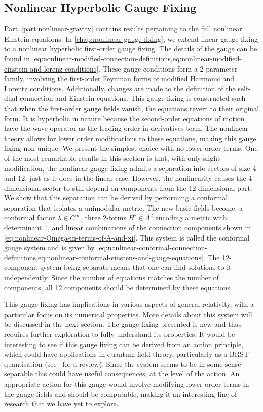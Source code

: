 \documentclass[10pt]{report}
\theoremstyle{definition}
\begin{document}
    \subsection{Nonlinear Hyperbolic Gauge Fixing}
    Part~\ref{part:nonlinear-gravity} contains results pertaining to the full nonlinear Einstein equations. In \cref{chap:nonlinear-gauge-fixing}, we extend linear gauge fixing to a nonlinear hyperbolic first-order gauge fixing. The details of the gauge can be found in \cref{eq:nonlinear-modified-connection-definitions,eq:nonlinear-modified-einstein-and-lorenz-conditions}. These gauge conditions form a 2-parameter family, involving the first-order Feynman forms of modified Harmonic and Lorentz conditions. Additionally, changes are made to the definition of the self-dual connection and Einstein equations. This gauge fixing is constructed such that when the first-order gauge fields vanish, the equations revert to their original form. It is hyperbolic in nature because the second-order equations of motion have the wave operator as the leading order in derivatives term. The nonlinear theory allows for lower order modifications to these equations, making this gauge fixing non-unique. We present the simplest choice with no lower order terms. One of the most remarkable results in this section is that, with only slight modification, the nonlinear gauge fixing admits a separation into sectors of size 4 and 12, just as it does in the linear case. However, the nonlinearity causes the 4-dimensional sector to still depend on components from the 12-dimensional part. We show that this separation can be derived by performing a conformal separation that isolates a unimodular metric. The new basic fields become: a conformal factor $\lambda \in C^\infty$, three 2-forms $H^i \in \Lambda^2$ encoding a metric with determinant 1, and linear combinations of the connection components shown in \cref{eq:nonlinear-Omega-in-terms-of-A-and-xi}. This system is called the conformal gauge system and is given by \cref{eq:nonlinear-conformal-connection-definitions,eq:nonlinear-conformal-einstens-and-gauge-equations}. The 12-component system being separate means that one can find solutions to it independently. Since the number of equations matches the number of components, all 12 components should be determined by these equations.

    This gauge fixing has implications in various aspects of general relativity, with a particular focus on its numerical properties. More details about this system will be discussed in the next section. The gauge fixing presented is new and thus requires further exploration to fully understand its properties. It would be interesting to see if this gauge fixing can be derived from an action principle, which could have applications in quantum field theory, particularly as a BRST quantisation (see~\cite{BRST_antifield_Fuster_2005} for a review). Since the system seems to be in some sense separable this could have useful consequences, at the level of the action. An appropriate action for this gauge would involve modifying lower order terms in the gauge fields and should be computable, making it an interesting line of research that we have yet to explore.
\end{document}
